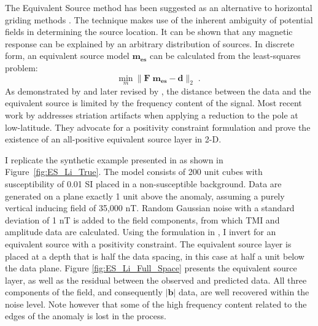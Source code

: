 The Equivalent Source method  has been suggested as an alternative to horizontal griding methods \cite[]{Dampney69}. The technique makes use of the inherent ambiguity of potential fields in determining the source location. 
It can be shown that any magnetic response can be explained by an arbitrary distribution of sources. 
In discrete form, an equivalent source model $\mathbf{m_{es}}$ can be calculated from the least-squares problem:
\begin{equation}\label{ES_LeastSquare}
	\underset{m}{\text{min}} \:\| \mathbf{F\;m_{es} - d}\|_2\;.
\end{equation}
As demonstrated by \cite{Dampney69} and later revised by \cite{Li2010}, the distance between the data and the equivalent source is limited by the frequency content of the signal.
Most recent work by \cite{LiNabighian14} addresses striation artifacts when applying a reduction to the pole at low-latitude. They advocate for a positivity constraint formulation and prove the existence of an all-positive equivalent source layer in 2-D.

I replicate the synthetic example presented in \cite{LiNabighian14} as shown in Figure~\ref{fig:ES_Li_True}. 
The model consists of 200 unit cubes with susceptibility of 0.01 SI placed in a non-susceptible background. Data are generated on a plane exactly 1 unit above the anomaly, assuming a purely vertical inducing field of 35,000 nT. Random Gaussian noise with a standard deviation of 1 nT is added to the field components, from which TMI and amplitude data are calculated.
Using the formulation in \cite{LiNabighian14}, I invert for an equivalent source with a positivity constraint. 
The equivalent source layer is placed at a depth that is half the data spacing, in this case at half a unit below the data plane.
Figure \ref{fig:ES_Li_Full_Space} presents the equivalent source layer, as well as the residual between the observed and predicted data. 
All three components of the field, and consequently $\mathbf{|b|}$ data, are well recovered within the noise level. 
Note however that some of the high frequency content related to the edges of the anomaly is lost in the process.

